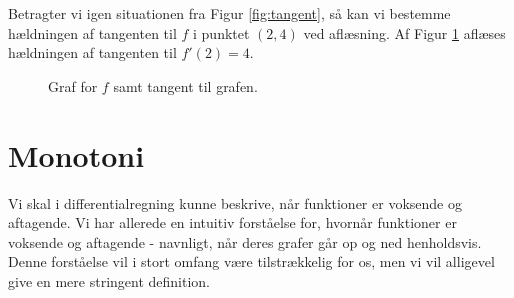 \begin{exa}
	Betragter vi igen situationen fra Figur \ref{fig:tangent}, så kan vi bestemme hældningen af tangenten til
	$f$ i punktet $(2,4)$ ved aflæsning. Af Figur \ref{fig:tangenttern} aflæses hældningen af tangenten til
	$f'(2) = 4$.
	\begin{figure}[H]
		\centering
		\caption{Graf for $f$ samt tangent til grafen.}
		\label{fig:tangenttern}
	\end{figure}	 
\end{exa}
\section*{Monotoni}
Vi skal i differentialregning kunne beskrive, når funktioner er voksende og aftagende. Vi har allerede en intuitiv forståelse for, hvornår funktioner er voksende og aftagende - navnligt, når deres grafer går op og ned  henholdsvis. Denne forståelse vil i stort omfang være tilstrækkelig for os, men vi vil alligevel give en mere stringent definition.


